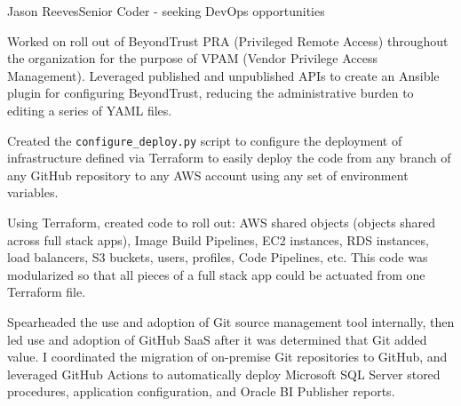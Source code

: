 \documentclass{article}
\begin{document}
\begin{cv}[avatar]{Jason Reeves}{Senior Coder - seeking DevOps opportunities}
\begin{cvevent}[2022-2023]
    Worked on roll out of BeyondTrust PRA (Privileged Remote Access) throughout the organization for the purpose of VPAM (Vendor Privilege Access Management).  Leveraged published and unpublished APIs to create an Ansible plugin for configuring BeyondTrust, reducing the administrative burden to editing a series of YAML files.  
    \vspace*{5mm}
\end{cvevent}

\begin{cvevent}[2020-2021]
    Created the \texttt{configure\_deploy.py} script to configure the deployment of infrastructure defined via Terraform to easily deploy the code from any branch of any GitHub repository to any AWS account using any set of environment variables.
    \vspace*{5mm}
\end{cvevent}

\begin{cvevent}[2020-2021]
    Using Terraform, created code to roll out: AWS shared objects (objects shared across full stack apps), Image Build Pipelines, EC2 instances, RDS instances, load balancers, S3 buckets, users, profiles, Code Pipelines, etc.  This code was modularized so that all pieces of a full stack app could be actuated from one Terraform file.
    \vspace*{5mm}
\end{cvevent}

\begin{cvevent}[2019-2020]
    Spearheaded the use and adoption of Git source management tool internally, then led use and adoption of GitHub SaaS after it was determined that Git added value.  I coordinated the migration of on-premise Git repositories to GitHub, and leveraged GitHub Actions to automatically deploy Microsoft SQL Server stored procedures, application configuration, and Oracle BI Publisher reports.
    \vspace*{5mm}
\end{cvevent}


\end{cv}
\end{document}
